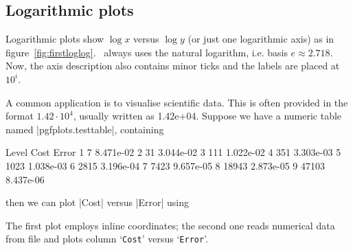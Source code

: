 \subsection{Logarithmic plots}
Logarithmic plots show $\log x$ versus $\log y$  (or just one logarithmic axis) as in figure~\ref{fig:firstloglog}. \PGFPlots\ always uses the natural logarithm, i.e. basis $e\approx2.718$. Now, the axis description also contains minor ticks and the labels are placed at $10^i$.
\begin{codeexample}[]
\end{codeexample}
A common application is to visualise scientific data. This is often provided in the format $1.42\cdot10^4$, usually written as 1.42e+04. Suppose we have a numeric table named |pgfplots.testtable|, containing
\begin{codeexample}[code only,tabsize=6]
Level	Cost	Error
1	7	8.471e-02
2	31	3.044e-02
3	111	1.022e-02
4	351	3.303e-03
5	1023	1.038e-03
6	2815	3.196e-04
7	7423	9.657e-05
8	18943	2.873e-05
9	47103	8.437e-06
\end{codeexample}
then we can plot |Cost| versus |Error| using
\begin{codeexample}[]
\end{codeexample}
The first plot employs inline coordinates; the second one reads numerical data from file and plots column `\texttt{Cost}' versus `\texttt{Error}'.

